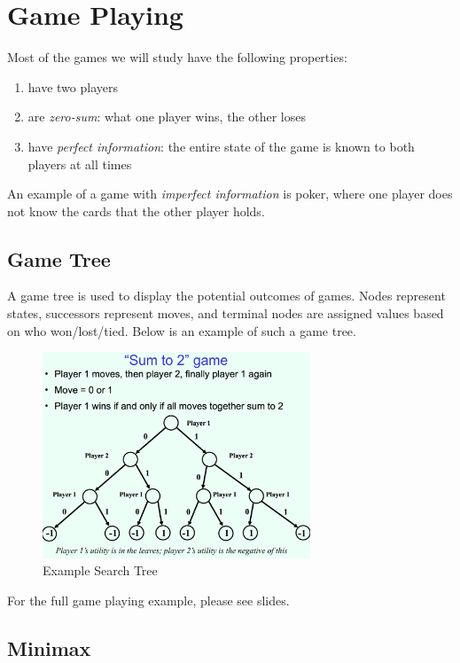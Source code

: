 \documentclass[letterpaper]{article} %
\begin{document}
\section{Game Playing}

Most of the games we will study have the following properties:

\begin{enumerate}
	\item have two players
	\item are \textit{zero-sum}: what one player wins, the other loses
	\item have \textit{perfect information}: the entire state of the game is known to both players at all times
\end{enumerate}

An example of a game with \textit{imperfect information} is poker, where one player does not know the cards that the other player holds.

\subsection{Game Tree}

A game tree is used to display the potential outcomes of games. Nodes represent states, successors represent moves, and terminal nodes are assigned values based on who won/lost/tied. Below is an example of such a game tree.

\begin{figure}[h]
\centering
\includegraphics[width=8cm]{search_tree}
\caption{Example Search Tree}
\end{figure}

For the full game playing example, please see slides.

\subsection{Minimax}
\end{document}
